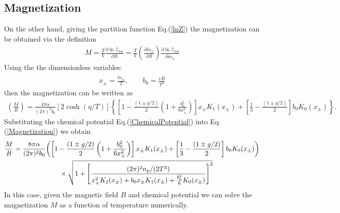 \documentclass[Universe,article,submit,moreauthors,pdftex]{Definitions/mdpi}
\begin{document}
\subsection{Magnetization}
On the other hand, giving the partition function Eq.(\ref{lnZ}) the magnetization can be obtained via the definition
\begin{align}
M=\frac{T}{V}\frac{\partial \ln\mathcal{Z}_{tot}}{\partial B}=\frac{T}{V}\left(\frac{\partial\tilde m_\pm}{\partial B}\right)\frac{\partial \ln\mathcal{Z}_{tot}}{\partial\tilde m_\pm}
\end{align}
Using the the dimensionless variables:
\begin{align}
x_\pm=\frac{\tilde m_\pm}{T},\qquad b_0=\frac{eB}{T^2}
\end{align}
then the magnetization can be written as
\begin{align}\label{Magnetization}
\left(\frac{M}{B}\right)=\frac{4\pi\alpha}{(2\pi)^2b_0}\left[2\cosh(\eta/T)\right]\left\{\left[1-\frac{(1\pm g/2)}{2}\left(1+\frac{b^2_0}{6x^2_\pm}\right)\right]x_\pm K_1(x_\pm)+\left[\frac{1}{3}-\frac{(1\pm g/2)}{2}\right]b_0K_0(x_\pm)\right\}.
\end{align}
Substituting the chemical potential Eq.(\ref{ChemicalPotential}) into Eq.(\ref{Magnetization}) we obtain
\begin{align}
\frac{M}{B}=\frac{8\pi\alpha}{(2\pi)^2b_0}&{\left(\left[1-\frac{(1\pm g/2)}{2}\left(1+\frac{b^2_0}{6x^2_\pm}\right)\right]x_\pm K_1(x_\pm)+\left[\frac{1}{3}-\frac{(1\pm g/2)}{2}\right]b_0K_0(x_\pm)\right)}\notag\\
&\qquad\times\sqrt{1+\left[\frac{{(2\pi)^2n_p}/{(2T^3)}}{x_\pm^2K_2(x_\pm)+b_0x_\pm K_1(x_\pm)+\frac{b^2_0}{6}K_0(x_\pm)}\right]^2}
\end{align}
In this case, given the magnetic field $B$ and chemical potential we can solve the magnetization $M$ as a function of temperature numerically.



\end{document}
